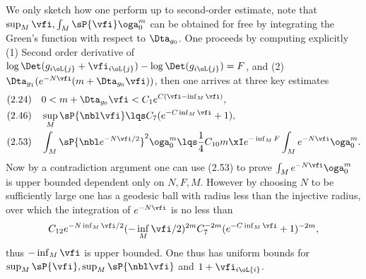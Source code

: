 \documentclass[article, a4paper, twoside]{universal}
\begin{document}
\begin{prf}
\begin{enr}[label = (\arabic*)]
		We only sketch how one perform up to second-order estimate, note that $\sup_{M}\vfi,\int_{M}\sP{\vfi}\oga_{0}^{m}$ can be obtained for free by integrating the Green's function with respect to $\Dta_{g_{0}}$. One proceeds by computing explicitly (1) Second order derivative of $\log\Det(g_{i\oL{j}}+\vfi_{i\oL{j}})-\log\Det(g_{i\oL{j}})=F$, and (2) $\Dta_{g_{1}}(e^{-N\vfi}(m+\Dta_{g_{0}}\vfi))$, then one arrives at three key estimates
		\begin{align*}
		  (2.24)&\quad 0<m+\Dta_{g_{0}}\vfi<C_{1}e^{C(\vfi-\inf_{M}\vfi)},\\
		  (2.46)&\quad \sup_{M}\sP{\nbl\vfi}\lqs C_{7}(e^{-C\inf_{M}\vfi}+1),\\
		  (2.53)&\quad \int_{M}\sP{\nbl e^{-N\vfi/2}}^{2}\oga_{0}^{m}\lqs \frac{1}{4}C_{10}m\xI e^{-\inf_{M}F}\int_{M}e^{-N\vfi}\oga_{0}^{m}.
		\end{align*}
		Now by a contradiction argument one can use (2.53) to prove $\int_{M}e^{-N\vfi}\oga_{0}^{m}$ is upper bounded dependent only on $N,F,M$. However by choosing $N$ to be sufficiently large one has a geodesic ball with radius less than the injective radius, over which the integration of $e^{-N\vfi}$ is no less than
		\[
			C_{12}e^{-N\inf_{M}\vfi/2}(-\inf_{M}\vfi/2)^{2m}C_{7}^{-2m}(e^{-C\inf_{M}\vfi}+1)^{-2m},
		\]
		thus $-\inf_{M}\vfi$ is upper bounded. One thus has uniform bounds for $\sup_{M}\sP{\vfi},\sup_{M}\sP{\nbl\vfi}$ and $1+\vfi_{i\oL{i}}$.
	\end{enr}
\end{prf}


\printref
\end{document}
